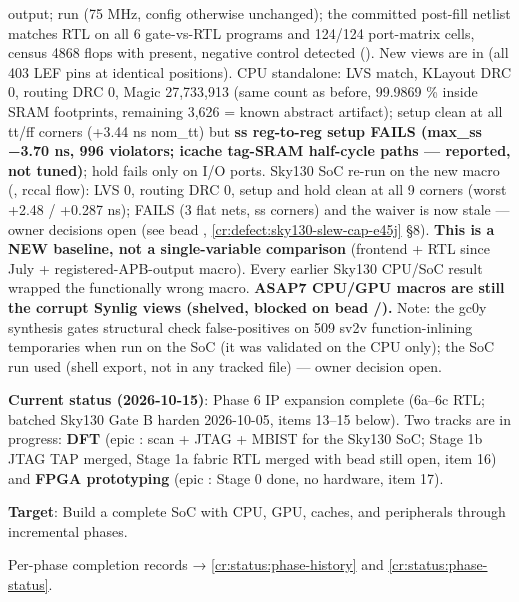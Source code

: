 \begin{record}
output; run  (75 MHz, config otherwise
unchanged); the committed post-fill netlist matches RTL on all 6
gate-vs-RTL programs and 124/124 port-matrix cells, census 4868 flops
with  present, negative control detected
(). New views are in
 (all 403 LEF pins at identical positions).
CPU standalone: LVS match, KLayout DRC 0, routing DRC 0, Magic
27,733,913 (same count as before, 99.9869 \% inside SRAM footprints,
remaining 3,626 = known  abstract artifact); setup clean
at all tt/ff corners (+3.44 ns nom\_tt) but \textbf{ss reg-to-reg setup
FAILS (max\_ss −3.70 ns, 996 violators; icache tag-SRAM half-cycle paths
--- reported, not tuned)}; hold fails only on I/O ports. Sky130 SoC
re-run on the new macro (, rccal flow):
LVS 0, routing DRC 0, setup and hold clean at all 9 corners (worst +2.48
/ +0.287 ns);  FAILS (3 flat nets, ss
corners) and the  waiver is now stale --- owner
decisions open (see bead , \cref{cr:defect:sky130-slew-cap-e45j}
§8). \textbf{This is a NEW baseline, not a single-variable comparison}
(frontend + RTL since July + registered-APB-output macro). Every earlier
Sky130 CPU/SoC result wrapped the functionally wrong macro.
\textbf{ASAP7 CPU/GPU macros are still the corrupt Synlig views
(shelved, blocked on bead /).} Note: the gc0y
synthesis gate\textquotesingle s structural  check
false-positives on 509 sv2v function-inlining temporaries when run on
the SoC (it was validated on the CPU only); the SoC run used
 (shell export, not in any tracked file) ---
owner decision open.

\textbf{Current status (2026-10-15)}: Phase 6 IP expansion \ok{}
complete (6a--6c RTL; batched Sky130 Gate B harden \ok{} 2026-10-05,
items 13--15 below). Two tracks are in progress: \textbf{DFT} (epic
: scan + JTAG + MBIST for the Sky130 SoC; Stage 1b JTAG TAP
merged, Stage 1a fabric RTL merged with bead  still open,
item 16) and \textbf{FPGA prototyping} (epic : Stage 0 done,
no hardware, item 17).

\textbf{Target}: Build a complete SoC with CPU, GPU, caches, and
peripherals through incremental phases.

Per-phase completion records → \cref{cr:status:phase-history} and
\cref{cr:status:phase-status}.

\end{record}


